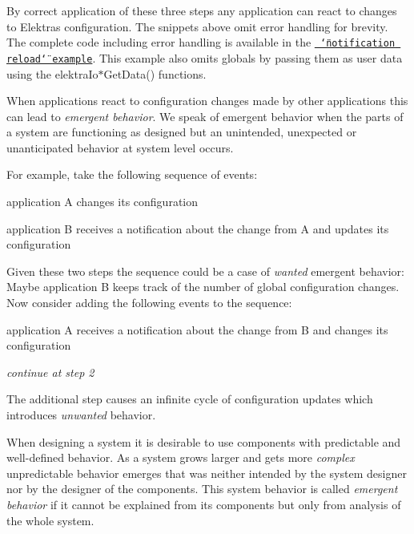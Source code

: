 By correct application of these three steps any application can react to changes to Elektra\textquotesingle{}s configuration. The snippets above omit error handling for brevity. The complete code including error handling is available in the \href{https://www.libelektra.org/examples/notificationreload}{\texttt{ \char`\"{}notification reload\char`\"{} example}}. This example also omits globals by passing them as user data using the {\ttfamily elektra\+Io$\ast$\+Get\+Data()} functions.

When applications react to configuration changes made by other applications this can lead to {\itshape emergent behavior}. We speak of emergent behavior when the parts of a system are functioning as designed but an unintended, unexpected or unanticipated behavior at system level occurs.

For example, take the following sequence of events\+:


\begin{DoxyEnumerate}
\item application {\ttfamily A} changes its configuration
\item application {\ttfamily B} receives a notification about the change from {\ttfamily A} and updates its configuration
\end{DoxyEnumerate}

Given these two steps the sequence could be a case of {\itshape wanted} emergent behavior\+: Maybe application {\ttfamily B} keeps track of the number of global configuration changes. Now consider adding the following events to the sequence\+:


\begin{DoxyEnumerate}
\item application {\ttfamily A} receives a notification about the change from {\ttfamily B} and changes its configuration
\item {\itshape continue at step 2}
\end{DoxyEnumerate}

The additional step causes an infinite cycle of configuration updates which introduces {\itshape unwanted} behavior.

When designing a system it is desirable to use components with predictable and well-\/defined behavior. As a system grows larger and gets more {\itshape complex} unpredictable behavior emerges that was neither intended by the system designer nor by the designer of the components. This system behavior is called {\itshape emergent behavior} if it cannot be explained from its components but only from analysis of the whole system.

